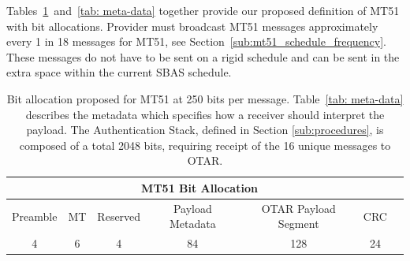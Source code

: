 \documentclass[letterpaper,times]{IONconf/IONconf}
\begin{document}
		Tables~\ref{tab: mt51-b}~and~\ref{tab: meta-data} together provide our proposed definition of MT51 with bit allocations.
		Provider must broadcast MT51 messages approximately every 1 in 18 messages for MT51, see Section~\ref{sub:mt51_schedule_frequency}.
		These messages do not have to be sent on a rigid schedule and can be sent in the extra space within the current SBAS schedule.

		\begin{table}%
			\center
			\begin{tabular}{|c|c|c|c|c|c|c|} \hline
				\multicolumn{6}{|c|}{MT51 Bit Allocation} \\ \hline
				Preamble & MT & Reserved & Payload Metadata & OTAR Payload Segment & CRC \\ \hline
				4 & 6 & 4 & 84 & 128 & 24 \\ \hline
			\end{tabular}
			\caption{
				Bit allocation proposed for MT51 at 250 bits per message. 
				Table~\ref{tab: meta-data} describes the metadata which specifies how a receiver should interpret the payload.
				The Authentication Stack, defined in Section \ref{sub:procedures}, is composed of a total 2048 bits, requiring receipt of the 16 unique messages to OTAR.
			}
			\label{tab: mt51-b}
		\end{table}
\end{document}
